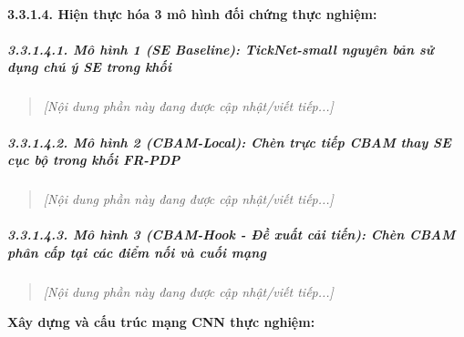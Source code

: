 \documentclass[
]{article}
\begin{document}
\paragraph{3.3.1.4. Hiện thực hóa 3 mô hình đối chứng thực nghiệm:}\label{3-3-1-4-models}

\subparagraph{3.3.1.4.1. Mô hình 1 (SE Baseline): TickNet-small nguyên bản sử dụng chú ý SE trong khối}\label{3-3-1-4-1-baseline}
\begin{quote}
\emph{[Nội dung phần này đang được cập nhật/viết tiếp...]}
\end{quote}

\subparagraph{3.3.1.4.2. Mô hình 2 (CBAM-Local): Chèn trực tiếp CBAM thay SE cục bộ trong khối FR-PDP}\label{3-3-1-4-2-local}
\begin{quote}
\emph{[Nội dung phần này đang được cập nhật/viết tiếp...]}
\end{quote}

\subparagraph{3.3.1.4.3. Mô hình 3 (CBAM-Hook - Đề xuất cải tiến): Chèn CBAM phân cấp tại các điểm nối và cuối mạng}\label{3-3-1-4-3-hook}
\begin{quote}
\emph{[Nội dung phần này đang được cập nhật/viết tiếp...]}
\end{quote}

\textbf{Xây dựng và cấu trúc mạng CNN thực nghiệm:}
\end{document}
